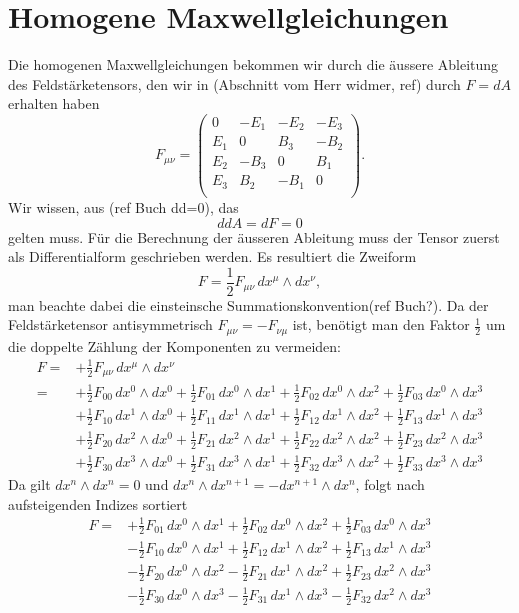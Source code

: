 \section{Homogene Maxwellgleichungen}
Die homogenen Maxwellgleichungen bekommen wir durch die äussere Ableitung des Feldstärketensors, den wir in (Abschnitt vom Herr widmer, ref) durch $F = dA$ erhalten haben
\[
F_{\mu\nu}
= 
\begin{pmatrix}
	0 & -E_1 & -E_2 & -E_3 \\
	E_1 &  0 &  B_3 & -B_2 \\
	E_2 & -B_3 &  0 &  B_1 \\
	E_3 &  B_2 & -B_1 &  0 \\
\end{pmatrix}.
\]
Wir wissen, aus (ref Buch dd=0), das
\[
ddA = dF = 0
\]
gelten muss.
Für die Berechnung der äusseren Ableitung muss der Tensor zuerst als Differentialform geschrieben werden.
Es resultiert die Zweiform
\[
F
= \frac{1}{2} F_{\mu\nu} \, dx^\mu \wedge dx^\nu,
\]
man beachte dabei die einsteinsche Summationskonvention(ref Buch?).
Da der Feldstärketensor antisymmetrisch $F_{\mu\nu} = -F_{\nu\mu}$ ist, benötigt man den Faktor $\frac{1}{2}$ um die doppelte Zählung der Komponenten zu vermeiden:
\begin{align*}
	F
	= 
	&+ \frac{1}{2} F_{\mu\nu} \, dx^\mu \wedge dx^\nu
	\\
	=
	&+ \frac{1}{2} F_{00} \, dx^0 \wedge dx^0 + \frac{1}{2} F_{01} \, dx^0 \wedge dx^1 + \frac{1}{2} F_{02} \, dx^0 \wedge dx^2 + \frac{1}{2} F_{03} \, dx^0 \wedge dx^3
	\\
	&+ \frac{1}{2} F_{10} \, dx^1 \wedge dx^0 + \frac{1}{2} F_{11} \, dx^1 \wedge dx^1 + \frac{1}{2} F_{12} \, dx^1 \wedge dx^2 + \frac{1}{2} F_{13} \, dx^1 \wedge dx^3
	\\
	&+ \frac{1}{2} F_{20} \, dx^2 \wedge dx^0 + \frac{1}{2} F_{21} \, dx^2 \wedge dx^1 + \frac{1}{2} F_{22} \, dx^2 \wedge dx^2 + \frac{1}{2} F_{23} \, dx^2 \wedge dx^3
	\\
	&+ \frac{1}{2} F_{30} \, dx^3 \wedge dx^0 + \frac{1}{2} F_{31} \, dx^3 \wedge dx^1 + \frac{1}{2} F_{32} \, dx^3 \wedge dx^2 + \frac{1}{2} F_{33} \, dx^3 \wedge dx^3
\end{align*} 
Da gilt $dx^n \wedge dx^n = 0$ und $dx^n \wedge dx^{n+1} = - dx^{n+1} \wedge dx^n$, folgt nach aufsteigenden Indizes sortiert
\begin{align*}
	F
	=
	&+ \frac{1}{2} F_{01} \, dx^0 \wedge dx^1 + \frac{1}{2} F_{02} \, dx^0 \wedge dx^2 + \frac{1}{2} F_{03} \, dx^0 \wedge dx^3
	\\
	&- \frac{1}{2} F_{10} \, dx^0 \wedge dx^1 + \frac{1}{2} F_{12} \, dx^1 \wedge dx^2 + \frac{1}{2} F_{13} \, dx^1 \wedge dx^3
	\\
	&- \frac{1}{2} F_{20} \, dx^0 \wedge dx^2 - \frac{1}{2} F_{21} \, dx^1 \wedge dx^2 + \frac{1}{2} F_{23} \, dx^2 \wedge dx^3
	\\
	&- \frac{1}{2} F_{30} \, dx^0 \wedge dx^3 - \frac{1}{2} F_{31} \, dx^1 \wedge dx^3 - \frac{1}{2} F_{32} \, dx^2 \wedge dx^3
\end{align*}
